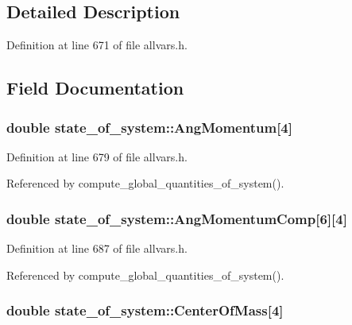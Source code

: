 \subsection{Detailed Description}


Definition at line 671 of file allvars.h.



\subsection{Field Documentation}
\hypertarget{structstate__of__system_a47635bc3c684637fff0c078223ae59fc}{
\subsubsection[{AngMomentum}]{\setlength{\rightskip}{0pt plus 5cm}double {\bf state\_\-of\_\-system::AngMomentum}\mbox{[}4\mbox{]}}}
\label{structstate__of__system_a47635bc3c684637fff0c078223ae59fc}


Definition at line 679 of file allvars.h.



Referenced by compute\_\-global\_\-quantities\_\-of\_\-system().

\hypertarget{structstate__of__system_a384a907f66c243418fbd02c317154c72}{
\subsubsection[{AngMomentumComp}]{\setlength{\rightskip}{0pt plus 5cm}double {\bf state\_\-of\_\-system::AngMomentumComp}\mbox{[}6\mbox{]}\mbox{[}4\mbox{]}}}
\label{structstate__of__system_a384a907f66c243418fbd02c317154c72}


Definition at line 687 of file allvars.h.



Referenced by compute\_\-global\_\-quantities\_\-of\_\-system().

\hypertarget{structstate__of__system_abdfe2ff074685ef9fdc4043beb898e98}{
\subsubsection[{CenterOfMass}]{\setlength{\rightskip}{0pt plus 5cm}double {\bf state\_\-of\_\-system::CenterOfMass}\mbox{[}4\mbox{]}}}
\label{structstate__of__system_abdfe2ff074685ef9fdc4043beb898e98}


